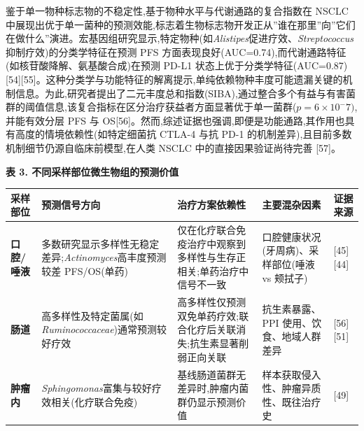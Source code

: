 \documentclass[11pt]{article}
\newcounter{none}
\begin{document}
鉴于单一物种标志物的不稳定性,基于物种水平与代谢通路的复合指数在 NSCLC 中展现出优于单一菌种的预测效能,标志着生物标志物开发正从''谁在那里''向''它们在做什么''演进。宏基因组研究显示,特定物种(如\emph{Alistipes}促进疗效、\emph{Streptococcus}抑制疗效)的分类学特征在预测 PFS 方面表现良好(AUC=0.74),而代谢通路特征(如核苷酸降解、氨基酸合成)在预测 PD-L1 状态上优于分类学特征(AUC=0.87){[}54{]}{[}55{]}。这种分类学与功能特征的解离提示,单纯依赖物种丰度可能遗漏关键的机制信息。为此,研究者提出了二元丰度总和指数(SIBA),通过整合多个有益与有害菌群的阈值信息,该复合指标在区分治疗获益者方面显著优于单一菌群(\(p=6\times10^-7)\),并能有效分层 PFS 与 OS{[}56{]}。然而,综述证据也强调,即便是功能通路,其作用也具有高度的情境依赖性(如特定细菌抗 CTLA-4 与抗 PD-1 的机制差异),且目前多数机制细节仍源自临床前模型,在人类 NSCLC 中的直接因果验证尚待完善 {[}57{]}。

\textbf{表 3. 不同采样部位微生物组的预测价值}

{\def\LTcaptype{none} %
\begin{longtable}[]{@{}
  >{\raggedright\arraybackslash}p{}
  >{\raggedright\arraybackslash}p{}
  >{\raggedright\arraybackslash}p{}
  >{\raggedright\arraybackslash}p{}
  >{\raggedright\arraybackslash}p{}@{}}
\toprule\noalign{}
\begin{minipage}[b]{\linewidth}\raggedright
采样部位
\end{minipage} & \begin{minipage}[b]{\linewidth}\raggedright
预测信号方向
\end{minipage} & \begin{minipage}[b]{\linewidth}\raggedright
治疗方案依赖性
\end{minipage} & \begin{minipage}[b]{\linewidth}\raggedright
主要混杂因素
\end{minipage} & \begin{minipage}[b]{\linewidth}\raggedright
证据来源
\end{minipage} \\
\midrule\noalign{}
\endhead
\bottomrule\noalign{}
\endlastfoot
\textbf{口腔/唾液} & 多数研究显示多样性无稳定差异;\emph{Actinomyces}高丰度预测较差 PFS/OS(单药) & 仅在化疗联合免疫治疗中观察到多样性与生存正相关;单药治疗中信号不一致 & 口腔健康状况(牙周病)、采样部位(唾液 vs 颊拭子) & {[}45{]}{[}44{]} \\
\textbf{肠道} & 高多样性及特定菌属(如\emph{Ruminococcaceae})通常预测较好疗效 & 高多样性仅预测双免单药疗效;联合化疗后关联消失;抗生素显著削弱正向关联 & 抗生素暴露、PPI 使用、饮食、地域人群差异 & {[}56{]}{[}51{]} \\
\textbf{肿瘤内} & \emph{Sphingomonas}富集与较好疗效相关(化疗联合免疫) & 基线肠道菌群无差异时,肿瘤内菌群仍显示预测价值 & 样本获取侵入性、肿瘤异质性、既往治疗史 & {[}49{]} \\
\end{longtable}
}
\end{document}
